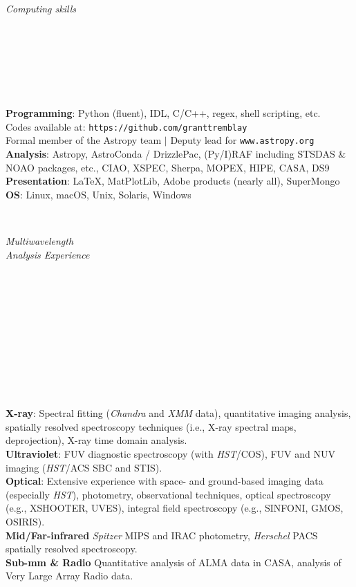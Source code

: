 \documentclass[11pt]{article}
\begin{document}
\hspace{2.5mm} \parbox{1.5in}{\textit{Computing skills \\\\\\\\\\\\\\}}
\parbox{5.15in}{
\textbf{Programming}: Python (fluent), IDL, C/C++, regex, shell scripting, etc. \\ Codes available at: {\small \texttt{https://github.com/granttremblay}}\\
Formal member of the Astropy team $|$ Deputy lead for \texttt{www.astropy.org} \\
\textbf{Analysis}: Astropy, AstroConda / DrizzlePac, (Py/I)RAF including STSDAS \& NOAO packages, etc., CIAO, XSPEC, Sherpa, MOPEX, HIPE, CASA, DS9 \\
\textbf{Presentation}:  \LaTeX, MatPlotLib, Adobe products (nearly all), SuperMongo \\
\textbf{OS}: Linux, macOS, Unix, Solaris, Windows\\
}\\

\hspace{2.5mm} \parbox{1.5in}{\textit{Multiwavelength \\ Analysis Experience \\\\\\\\\\\\\\\\\\\\\\}} \parbox{5.15in}{
\textbf{X-ray}: Spectral fitting (\textit{Chandra} and \textit{XMM} data), quantitative imaging analysis, spatially resolved spectroscopy techniques (i.e., X-ray spectral maps, deprojection), X-ray time domain analysis. \\
\textbf{Ultraviolet}: FUV diagnostic spectroscopy (with \textit{HST}/COS), FUV and NUV imaging (\textit{HST}/ACS SBC and STIS). \\
\textbf{Optical}: Extensive experience with space- and ground-based imaging data (especially \textit{HST}), photometry, observational techniques, optical spectroscopy (e.g., XSHOOTER, UVES),  integral field spectroscopy (e.g., SINFONI, GMOS, OSIRIS). \\
\textbf{Mid/Far-infrared} \textit{Spitzer} MIPS and IRAC photometry, \textit{Herschel} PACS spatially resolved spectroscopy.  \\
\textbf{Sub-mm \& Radio} Quantitative analysis of ALMA data in CASA, analysis of Very Large Array Radio data.  \\
}\\
\end{document}
